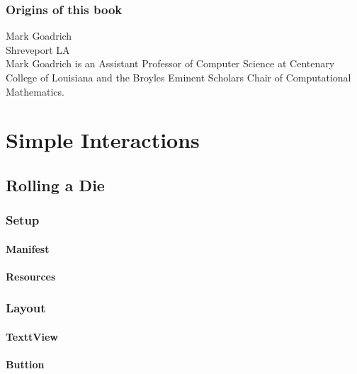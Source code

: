 \documentclass[10pt]{book}
\begin{document}
\section*{Origins of this book}

Mark Goadrich\\
Shreveport LA\\

Mark Goadrich is an Assistant Professor of Computer Science
at Centenary College of Louisiana and the Broyles Eminent Scholars 
Chair of Computational Mathematics.

\normalsize

\clearemptydoublepage

\begin{latexonly}

\tableofcontents

\clearemptydoublepage

\end{latexonly}

\mainmatter

\part{Simple Interactions}

\chapter{Rolling a Die}
\section{Setup}
\subsection{Manifest}
\subsection{Resources}
\section{Layout}
\subsection{TexttView}
\subsection{Buttion}
\end{document}
